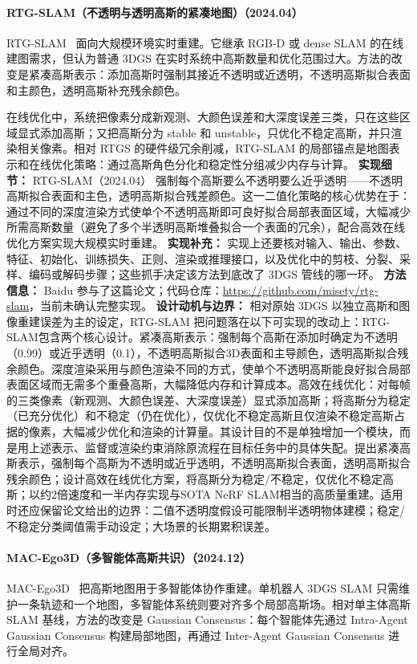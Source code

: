 \paragraph{RTG-SLAM（不透明与透明高斯的紧凑地图）（2024.04）}
RTG-SLAM~\cite{2404_19706} 面向大规模环境实时重建。它继承 RGB-D 或 dense SLAM 的在线建图需求，但认为普通 3DGS 在实时系统中高斯数量和优化范围过大。方法的改变是紧凑高斯表示：添加高斯时强制其接近不透明或近透明，不透明高斯拟合表面和主颜色，透明高斯补充残余颜色。

在线优化中，系统把像素分成新观测、大颜色误差和大深度误差三类，只在这些区域显式添加高斯；又把高斯分为 stable 和 unstable，只优化不稳定高斯，并只渲染相关像素。相对 RTGS 的硬件级冗余削减，RTG-SLAM 的局部锚点是地图表示和在线优化策略：通过高斯角色分化和稳定性分组减少内存与计算。
\textbf{实现细节：} RTG-SLAM（2024.04） 强制每个高斯要么不透明要么近乎透明——不透明高斯拟合表面和主色，透明高斯拟合残差颜色。这一二值化策略的核心优势在于：通过不同的深度渲染方式使单个不透明高斯即可良好拟合局部表面区域，大幅减少所需高斯数量（避免了多个半透明高斯堆叠拟合一个表面的冗余），配合高效在线优化方案实现大规模实时重建。
\textbf{实现补充：} 实现上还要核对输入、输出、参数、特征、初始化、训练损失、正则、渲染或推理接口，以及优化中的剪枝、分裂、采样、编码或解码步骤；这些抓手决定该方法到底改了 3DGS 管线的哪一环。
\textbf{方法信息：} Baidu 参与了这篇论文；代码仓库：\url{https://github.com/misety/rtg-slam}，当前未确认完整实现。
\textbf{设计动机与边界：} 相对原始 3DGS 以独立高斯和图像重建误差为主的设定，RTG-SLAM 把问题落在以下可实现的改动上：RTG-SLAM包含两个核心设计。紧凑高斯表示：强制每个高斯在添加时确定为不透明（0.99）或近乎透明（0.1），不透明高斯拟合3D表面和主导颜色，透明高斯拟合残余颜色。深度渲染采用与颜色渲染不同的方式，使单个不透明高斯能良好拟合局部表面区域而无需多个重叠高斯，大幅降低内存和计算成本。高效在线优化：对每帧的三类像素（新观测、大颜色误差、大深度误差）显式添加高斯；将高斯分为稳定（已充分优化）和不稳定（仍在优化），仅优化不稳定高斯且仅渲染不稳定高斯占据的像素，大幅减少优化和渲染的计算量。其设计目的不是单独增加一个模块，而是用上述表示、监督或渲染约束消除原流程在目标任务中的具体失配。提出紧凑高斯表示，强制每个高斯为不透明或近乎透明，不透明高斯拟合表面，透明高斯拟合残余颜色；设计高效在线优化方案，将高斯分为稳定/不稳定，仅优化不稳定高斯；以约2倍速度和一半内存实现与SOTA NeRF SLAM相当的高质量重建。适用时还应保留论文给出的边界：二值不透明度假设可能限制半透明物体建模；稳定/不稳定分类阈值需手动设定；大场景的长期累积误差。
\paragraph{MAC-Ego3D（多智能体高斯共识）（2024.12）}
MAC-Ego3D~\cite{2412_09723} 把高斯地图用于多智能体协作重建。单机器人 3DGS SLAM 只需维护一条轨迹和一个地图，多智能体系统则要对齐多个局部高斯场。相对单主体高斯 SLAM 基线，方法的改变是 Gaussian Consensus：每个智能体先通过 Intra-Agent Gaussian Consensus 构建局部地图，再通过 Inter-Agent Gaussian Consensus 进行全局对齐。

